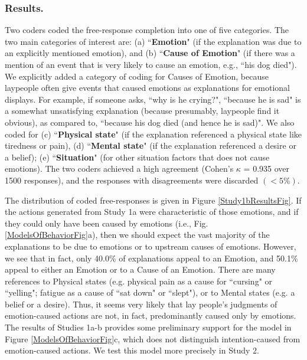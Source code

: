 \documentclass[10pt,letterpaper]{article}
\newcommand{\ndg}[1]{\textcolor{Green}{[ndg: #1]}}
\begin{document}
\subsubsection{Results.} 
Two coders coded the free-response completion into one of five categories. The two main categories of interest are: (a) ``\textbf{Emotion}" (if the explanation was due to an explicitly mentioned emotion), and (b) ``\textbf{Cause of Emotion}" (if there was a mention of an event that is very likely to cause an emotion, e.g., ``his dog died"). We explicitly added a category of coding for Causes of Emotion, because laypeople often give events that caused emotions as explanations for emotional displays. For example, if someone asks, ``why is he crying?", ``because he is sad" is a somewhat unsatisfying explanation (because presumably, laypeople find it obvious), as compared to, ``because his dog died (and hence he is sad)". We also coded for (c) ``\textbf{Physical state}" (if the explanation referenced a physical state like tiredness or pain), (d) ``\textbf{Mental state}" (if the explanation referenced a desire or a belief); (e) ``\textbf{Situation}" (for other situation factors that does not cause emotions). The two coders achieved a high agreement (Cohen's $\kappa$ = 0.935 over 1500 responses), and the responses with disagreements were discarded $(<5\%)$. 

The distribution of coded free-responses is given in Figure \ref{Study1bResultsFig}. %
If the actions generated from Study 1a were characteristic of those emotions, and if they could only have been caused by emotions (i.e., Fig. \ref{ModelsOfBehaviorFig}a), then we should expect the vast majority of the explanations to be due to emotions or to upstream causes of emotions. However, we see that in fact, only 40.0\% of explanations appeal to an Emotion, and 50.1\% appeal to either an Emotion or to a Cause of an Emotion. There are many references to Physical states (e.g. physical pain as a cause for ``cursing" or ``yelling"; fatigue as a cause of ``sat down" or ``slept"), or to Mental states (e.g. a belief or a desire). Thus, it seems very likely that lay people's judgments of emotion-caused actions are not, in fact, predominantly caused only by emotions. 
The results of Studies 1a-b provides some preliminary support for the model in Figure \ref{ModelsOfBehaviorFig}c, which does not distinguish intention-caused from emotion-caused actions. 
We test this model more precisely in Study 2.
\end{document}
